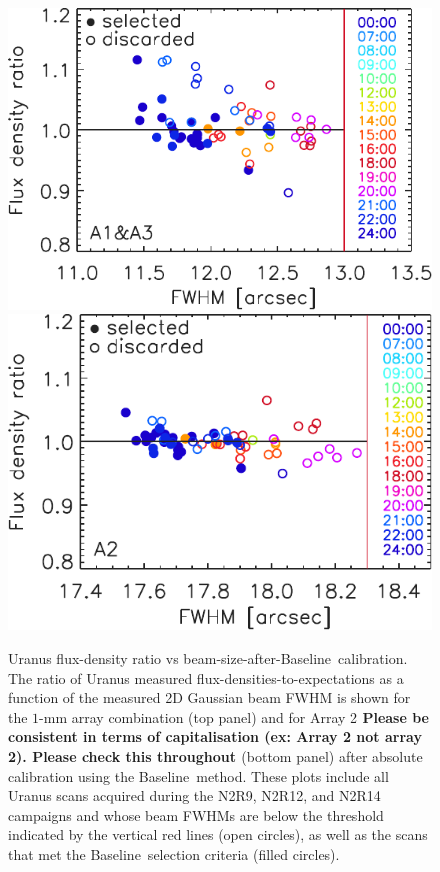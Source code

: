 \documentclass[traditionalabstract]{aa}
\newcommand{\baseline}{Baseline}%
\newcommand{\LEt}[1]{{\bf {\color[RGB]{0, 153, 255} #1}}}
\begin{document}
{\begin{figure}[!htbp]
\begin{center}
\includegraphics[clip=true, trim={0, -0.3cm, -0.3cm, 0}, width=0.72\linewidth]{Figures/plot_flux_density_ratio_fwhm_uranus_corrected_skydip_narrow_1mm.pdf}
\includegraphics[clip=true, trim={0cm, -0.3cm, -0.6cm, 0}, width=0.707\linewidth]{Figures/plot_flux_density_ratio_fwhm_uranus_corrected_skydip_narrow_a2.pdf}
\caption[Uranus flux density stability against FWHM]{ Uranus flux-density ratio vs beam-size-after-\baseline\ calibration. The ratio
of Uranus measured flux-densities-to-expectations as a function of the
measured 2D Gaussian beam FWHM is shown for the $1$-mm array
combination (top panel) and for Array 2\LEt{Please be consistent in terms of capitalisation (ex: Array 2 not array 2). Please check this throughout } (bottom panel) after absolute calibration using the \baseline\ method. These plots include all Uranus scans acquired during the 
N2R9, N2R12, and N2R14 campaigns and whose beam FWHMs are below the threshold indicated
by the vertical red lines (open circles), as well as the scans that
met the \baseline\ selection criteria (filled circles).}
\label{fig:calib_uranus_vs_fwhm_all}
\end{center}
\end{figure}

}
\end{document}
